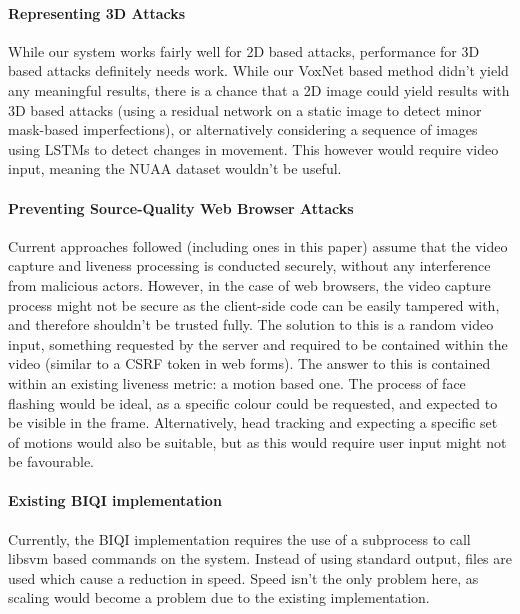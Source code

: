 \documentclass[11pt,a4paper]{article}
\begin{document}
        \paragraph{Representing 3D Attacks}
        While our system works fairly well for 2D based attacks, performance for 3D based attacks definitely needs work.
        While our VoxNet based method didn't yield any meaningful results, there is a chance that a 2D image could yield results
        with 3D based attacks (using a residual network on a static image to detect minor mask-based imperfections), or alternatively
        considering a sequence of images using LSTMs to detect changes in movement. This however would require video input, meaning the
        NUAA dataset wouldn't be useful.

        \paragraph{Preventing Source-Quality Web Browser Attacks}
        Current approaches followed (including ones in this paper) assume that the video capture and liveness processing is conducted securely, 
        without any interference from malicious actors. However, in the case of web browsers, the video capture process might not be secure as
        the client-side code can be easily tampered with, and therefore shouldn't be trusted fully. The solution to this is a random video input,
        something requested by the server and required to be contained within the video (similar to a CSRF token in web forms). The answer to this
        is contained within an existing liveness metric: a motion based one. The process of face flashing would be ideal, as a specific colour could
        be requested, and expected to be visible in the frame. Alternatively, head tracking and expecting a specific set of motions would also be suitable,
        but as this would require user input might not be favourable.

        
        \paragraph{Existing BIQI implementation}
        Currently, the BIQI implementation requires the use of a subprocess to call libsvm based commands on the system. Instead of using standard output, files are used which
        cause a reduction in speed.
        Speed isn't the only problem here, as scaling would become a problem due to the existing implementation. 
\end{document}
